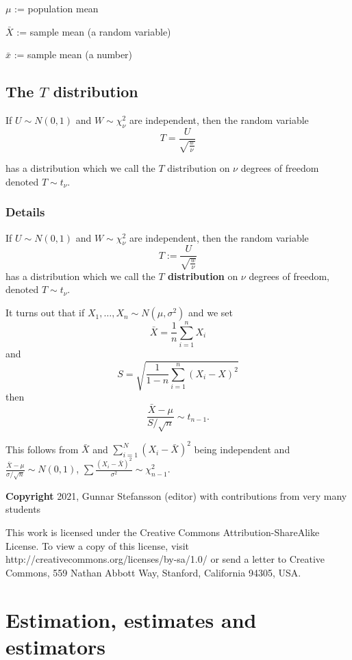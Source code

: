 \documentclass[12pt,a4paper]{article}
\theoremstyle{regla}
\theoremstyle{remark}
\theoremstyle{definition}
\theoremstyle{nonumberbreak}
\begin{document}
$\mu$ := population mean

$\bar{X}$ := sample mean (a random variable)

$\bar{x}$ := sample mean (a number)





\subsection{The $T$ distribution}
\begin{fbox}
\begin{minipage}{0.97\textwidth}
If $U\sim N(0,1)$ and $W\sim\chi^{2}_{\nu}$ are independent, then the random variable $$T=\frac{U}{\sqrt{\frac{w}{\nu}}}$$

has a distribution which we call the $T$ distribution on $\nu$ degrees of freedom denoted $T \sim t_{\nu}$. 
\end{minipage}
\end{fbox}
\subsubsection{Details}
\begin{defn}
If $U\sim N(0,1)$ and $W\sim\chi^{2}_{\nu}$ are independent, then the
random variable 
$$
T:=\frac{U}{\sqrt{\frac{w}{\nu}}}
$$ 
has a
distribution which we call the {\bf $T$ distribution} on $\nu$ degrees of
freedom, denoted $T \sim t_\nu$. 
\end{defn}
It turns out that if
$X_1, \ldots ,X_n \sim N(\mu,\sigma ^2)$ 
and we set
$$
\bar{X}=\frac{1}{n}\sum_{i=1}^n X_i
$$ 
and 
$$
S=
\sqrt{\frac{1}{1-n}\sum_{i=1}^n (X_i-X)^2}
$$ 
then
$$
\frac{\bar{X}-\mu}{S/\sqrt{n}} \sim t_{n-1}.
$$

This follows from $\bar{X}$ and $\sum_{i=1}^N(X_i-\bar{X})^2$ being
independent and $\frac{\bar{X}-\mu}{\sigma/\sqrt{n}}\sim N(0,1)$,
$\sum \frac{(X_i-\bar{X})^2}{\sigma^2}\sim \chi_{n-1}^2$.


{\bf Copyright}
2021, Gunnar Stefansson (editor) with contributions from very many students

This work is licensed under the Creative Commons
Attribution-ShareAlike License. To view a copy of this license, visit
http://creativecommons.org/licenses/by-sa/1.0/ or send a letter to
Creative Commons, 559 Nathan Abbott Way, Stanford, California 94305,
USA.
\clearpage
\section{Estimation, estimates and estimators}
\end{document}
